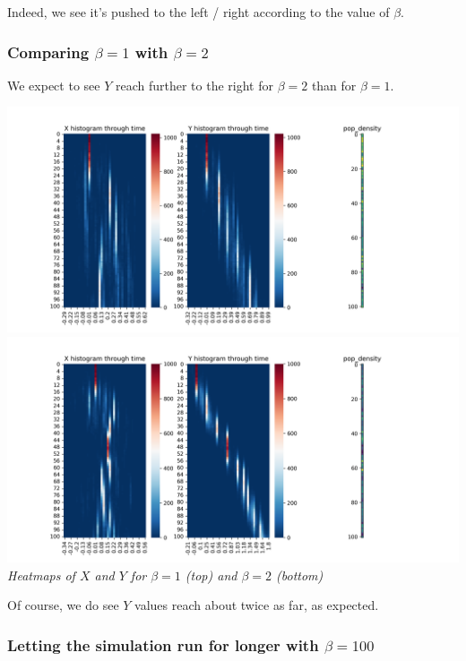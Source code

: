 \documentclass{article}
\begin{document}
Indeed, we see it's pushed to the left / right according to the value of $\beta$. \\

\subsubsection{Comparing $\beta = 1$ with $\beta = 2$}

We expect to see $Y$ reach further to the right for $\beta = 2$ than for $\beta = 1$. \\
\begin{center}
\includegraphics[scale=0.37]{beta=1}
\includegraphics[scale=0.37]{beta=2} \\
\textit{Heatmaps of $X$ and $Y$ for $\beta = 1$ (top) and $\beta = 2$ (bottom)}
\end{center}
\vspace{5mm}

Of course, we do see $Y$ values reach about twice as far, as expected. \\
\vspace{5mm}

\subsubsection{Letting the simulation run for longer with $\beta = 100$}
\end{document}
